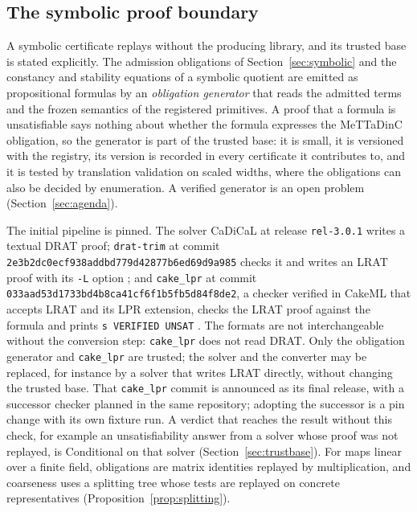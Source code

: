 \documentclass[11pt]{article}
\newcommand{\code}[1]{\texttt{#1}}
\theoremstyle{definition}
\theoremstyle{plain}
\begin{document}
\subsection{The symbolic proof boundary}

A symbolic certificate replays without the producing library, and its trusted base is stated
explicitly. The admission obligations of Section~\ref{sec:symbolic} and the constancy and stability
equations of a symbolic quotient are emitted as propositional formulas by an \emph{obligation
generator} that reads the admitted terms and the frozen semantics of the registered primitives. A
proof that a formula is unsatisfiable says nothing about whether the formula expresses the MeTTaDinC
obligation, so the generator is part of the trusted base: it is small, it is versioned with the
registry, its version is recorded in every certificate it contributes to, and it is tested by
translation validation on scaled widths, where the obligations can also be decided by enumeration.
A verified generator is an open problem (Section~\ref{sec:agenda}).

The initial pipeline is pinned. The solver CaDiCaL at release \code{rel-3.0.1}
\cite{cadical} writes a textual DRAT proof; \code{drat-trim} at commit
\code{2e3b2dc0ecf938addbd779d42877b6ed69d9a985} checks it and writes an LRAT proof with its
\code{-L} option \cite{drattrim}; and \code{cake\_lpr} at commit
\code{033aad53d1733bd4b8ca41cf6f1b5fb5d84f8de2}, a checker verified in CakeML that accepts LRAT and
its LPR extension, checks the LRAT proof against the formula and prints \code{s VERIFIED UNSAT}
\cite{cakelpr,cakelprsttt}. The formats are not interchangeable without the conversion step:
\code{cake\_lpr} does not read DRAT. Only the obligation generator and \code{cake\_lpr} are trusted;
the solver and the converter may be replaced, for instance by a solver that writes LRAT directly,
without changing the trusted base. That \code{cake\_lpr} commit is announced as its final release,
with a successor checker planned in the same repository; adopting the successor is a pin change
with its own fixture run. A verdict that reaches the result without this check, for example an
unsatisfiability answer from a solver whose proof was not replayed, is Conditional on that solver
(Section~\ref{sec:trustbase}). For maps linear over a finite field, obligations are matrix identities
replayed by multiplication, and coarseness uses a splitting tree whose tests are replayed on
concrete representatives (Proposition~\ref{prop:splitting}).
\end{document}
